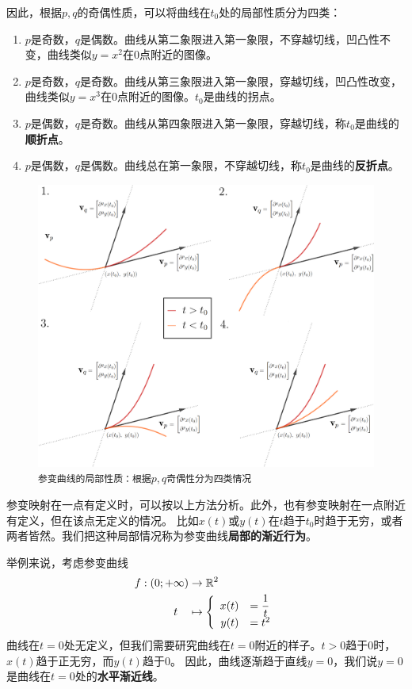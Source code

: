 \documentclass[12pt,UTF8]{ctexbook}
\theoremstyle{definition}
\theoremstyle{plain}
\begin{document}
因此，根据$p,q$的奇偶性质，可以将曲线在$t_0$处的局部性质分为四类：
\begin{enumerate}
    \item $p$是奇数，$q$是偶数。曲线从第二象限进入第一象限，不穿越切线，凹凸性不变，曲线类似$y = x^2$在$0$点附近的图像。
    \item $p$是奇数，$q$是奇数。曲线从第三象限进入第一象限，穿越切线，凹凸性改变，曲线类似$y = x^3$在$0$点附近的图像。$t_0$是曲线的拐点。
    \item $p$是偶数，$q$是奇数。曲线从第四象限进入第一象限，穿越切线，称$t_0$是曲线的\textbf{顺折点}。
    \item $p$是偶数，$q$是偶数。曲线总在第一象限，不穿越切线，称$t_0$是曲线的\textbf{反折点}。
\end{enumerate}

\begin{figure}[h] 
    \centering
    \includegraphics[width=\textwidth]{tu/参数曲线局部展开1.png}
    \caption*{\texttt{参变曲线的局部性质：根据$p,q$奇偶性分为四类情况}}
\end{figure}

参变映射在一点有定义时，可以按以上方法分析。此外，也有参变映射在一点附近有定义，但在该点无定义的情况。
比如$x(t)$或$y(t)$在$t$趋于$t_0$时趋于无穷，或者两者皆然。我们把这种局部情况称为参变曲线\textbf{局部的渐近行为}。

举例来说，考虑参变曲线
\begin{align*}
    f: (0; +\infty) &\rightarrow \mathbb{R}^2 \\
    t\quad &\mapsto\left\{
        \begin{array}[]{rl}
            x(t) &\displaystyle = \frac{1}{t} \\
            y(t) &= t^2\\
        \end{array}
    \right.
\end{align*}
曲线在$t=0$处无定义，但我们需要研究曲线在$t=0$附近的样子。$t>0$趋于$0$时，$x(t)$趋于正无穷，而$y(t)$趋于$0$。
因此，曲线逐渐趋于直线$y = 0$，我们说$y = 0$是曲线在$t=0$处的\textbf{水平渐近线}。
\end{document}
